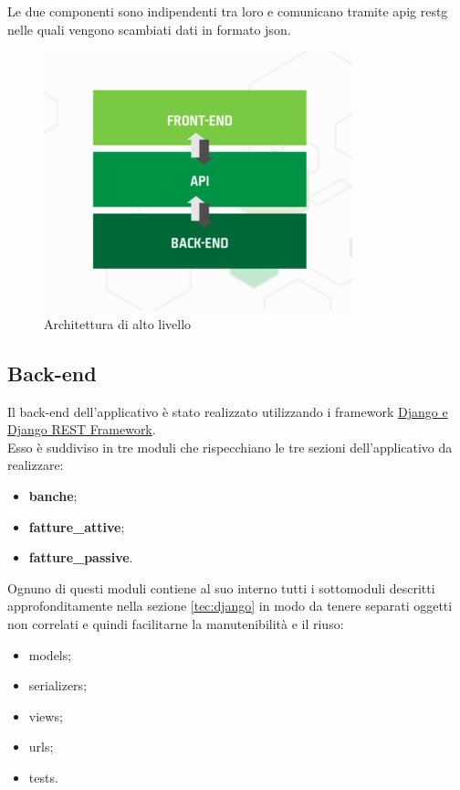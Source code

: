 	Le due componenti sono indipendenti tra loro e comunicano tramite \gls{apig} \gls{restg} nelle quali vengono scambiati dati in formato \gls{json}.

	\begin{figure}[H]
		\centering
		\includegraphics[width=0.8\linewidth]{immagini/arch}
		\caption{Architettura di alto livello}
		\label{fig:arch}
	\end{figure}

	\subsection{Back-end}
	Il back-end dell'applicativo è stato realizzato utilizzando i framework \hyperref[tec:django]{Django e Django REST Framework}\cite{site:djangorest}.\\
	Esso è suddiviso in tre moduli che rispecchiano le tre sezioni dell'applicativo da realizzare:
	\begin{itemize}
		\item \textbf{banche};
		\item \textbf{fatture\_attive};
		\item \textbf{fatture\_passive}.
	\end{itemize}
	
	Ognuno di questi moduli contiene al suo interno tutti i sottomoduli descritti approfonditamente nella sezione \ref{tec:django} in modo da tenere separati oggetti non correlati e quindi facilitarne la manutenibilità e il riuso:
	\begin{itemize}
		\item models;
		\item serializers;
		\item views;
		\item urls;
		\item tests.
	\end{itemize}

